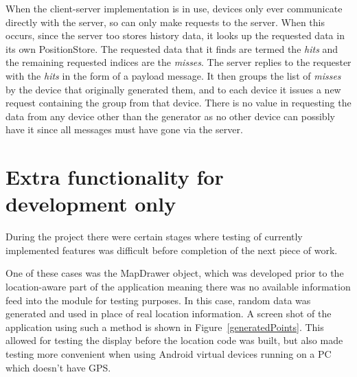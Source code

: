 When the client-server implementation is in use, devices only ever communicate directly with the server, so can only make requests to the server. When this occurs, since the server too stores history data, it looks up the requested data in its own PositionStore. The requested data that it finds are termed the \emph{hits} and the remaining requested indices are the \emph{misses}. The server replies to the requester with the \emph{hits} in the form of a payload message. It then groups the list of \emph{misses} by the device that originally generated them, and to each device it issues a new request containing the group from that device. There is no value in requesting the data from any device other than the generator as no other device can possibly have it since all messages must have gone via the server.

\section{Extra functionality for development only}

During the project there were certain stages where testing of currently implemented features was difficult before completion of the next piece of work.

One of these cases was the MapDrawer object, which was developed prior to the location-aware part of the application meaning there was no available information feed into the module for testing purposes. In this case, random data was generated and used in place of real location information. A screen shot of the application using such a method is shown in Figure~\ref{generatedPoints}. This allowed for testing the display before the location code was built, but also made testing more convenient when using Android virtual devices running on a PC which doesn't have GPS.

